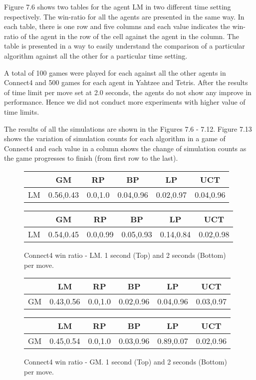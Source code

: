 \documentclass[double,12pt]{beavtex}
\begin{document}
Figure 7.6 shows two tables for the agent LM in two different time setting respectively. The win-ratio for all the agents are presented in the same way. In each table, there is one row and five columns and each value indicates the win-ratio of the agent in the row of the cell against the agent in the column. The table is presented in a way to easily understand the comparison of a particular algorithm against all the other for a particular time setting. 

A total of 100 games were played for each against all the other agents in Connect4 and 500 games for each agent in Yahtzee and Tetris. After the results of time limit per move set at 2.0 seconds, the agents do not show any improve in performance. Hence we did not conduct more experiments with higher value of time limits. 

The results of all the simulations are shown in the Figures 7.6 - 7.12. Figure 7.13 shows the variation of simulation counts for each algorithm in a game of Connect4 and each value in a column shows the change of simulation counts as the game progresses to finish (from first row to the last).

\begin{figure}
\centering
\begin{tabular}{|c|c|c|c|c|c|} 
 \hline
  & GM & RP & BP & LP & UCT \\
 \hline
 LM & 0.56,0.43 & 0.0,1.0 & 0.04,0.96 & 0.02,0.97 & 0.04,0.96 \\
 \hline
\end{tabular}
\linebreak
\linebreak
\linebreak
\begin{tabular}{|c|c|c|c|c|c|} 
 \hline
  & GM & RP & BP & LP & UCT \\
 \hline
 LM & 0.54,0.45 & 0.0,0.99 & 0.05,0.93 & 0.14,0.84 & 0.02,0.98 \\
 \hline
\end{tabular}
\caption{Connect4 win ratio - LM. 1 second (Top) and 2 seconds (Bottom) per move.}
\end{figure}

\begin{figure}
\centering
\begin{tabular}{|c|c|c|c|c|c|} 
 \hline
  & LM & RP & BP & LP & UCT \\
 \hline
 GM & 0.43,0.56 & 0.0,1.0 & 0.02,0.96 & 0.04,0.96 & 0.03,0.97 \\
 \hline
\end{tabular}
\linebreak
\linebreak
\linebreak
\begin{tabular}{|c|c|c|c|c|c|} 
 \hline
  & LM & RP & BP & LP & UCT \\
 \hline
 GM & 0.45,0.54 & 0.0,1.0 & 0.03,0.96 & 0.89,0.07 & 0.02,0.96 \\
 \hline
\end{tabular}
\caption{Connect4 win ratio - GM. 1 second (Top) and 2 seconds (Bottom) per move.}
\end{figure}
\end{document}
